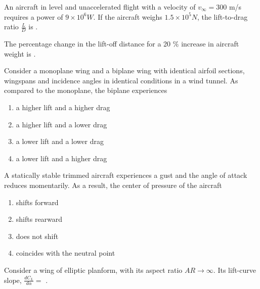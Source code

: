 \iffalse
\author{Manvik Muthyapu - AI24BTECH11021}
\section{ae}
\chapter{2015}
\fi
\item An aircraft in level and unaccelerated flight with a velocity of $v_\infty = 300$ m/s requires a power of $9 \times 10^6 W$. If the aircraft weighs $1.5 \times 10^5 N$, the lift-to-drag ratio $\frac{L}{D}$ is \underline{\hspace{2cm}}. 

\item The percentage change in the lift-off distance for a 20 $\%$ increase in aircraft weight is \underline{\hspace{2cm}}.

\item Consider a monoplane wing and a biplane wing with identical airfoil sections, wingspans and incidence angles in identical conditions in a wind tunnel. As compared to the monoplane, the biplane experiences 

\begin{enumerate}
	\item a higher lift and a higher drag
	\item a higher lift and a lower drag
	\item a lower lift and a lower drag
	\item a lower lift and a higher drag
\end{enumerate}

\item A statically stable trimmed aircraft experiences a gust and the angle of attack reduces momentarily. As a result, the center of pressure of the aircraft

\begin{enumerate}
	\item shifts forward
	\item shifts rearward
	\item does not shift
	\item coincides with the neutral point
\end{enumerate}

\item Consider a wing of elliptic planform, with its aspect ratio $AR \rightarrow \infty$. Its lift-curve slope, $\frac{dC_{L}}{d\alpha}=$ \underline{\hspace{2cm}}.

